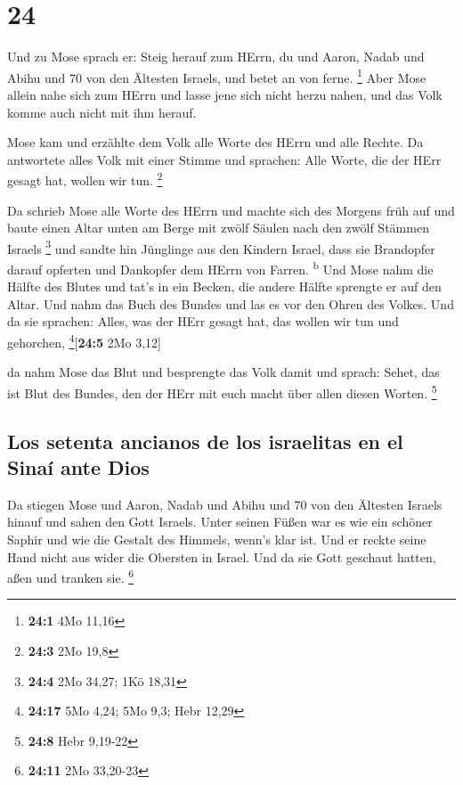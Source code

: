 \hypertarget{section-23}{%
\section{24}\label{section-23}}

 Und zu Mose sprach er: Steig herauf zum HErrn, du und
Aaron, Nadab und Abihu und 70 von den Ältesten Israels, und betet an von
ferne. \footnote{\textbf{24:1} 4Mo 11,16}  Aber Mose
allein nahe sich zum HErrn und lasse jene sich nicht herzu nahen, und
das Volk komme auch nicht mit ihm herauf.

 Mose kam und erzählte dem Volk alle Worte des HErrn und
alle Rechte. Da antwortete alles Volk mit einer Stimme und sprachen:
Alle Worte, die der HErr gesagt hat, wollen wir tun. \footnote{\textbf{24:3}
  2Mo 19,8}

 Da schrieb Mose alle Worte des HErrn und machte sich des
Morgens früh auf und baute einen Altar unten am Berge mit zwölf Säulen
nach den zwölf Stämmen Israels \footnote{\textbf{24:4} 2Mo 34,27; 1Kö
  18,31}  und sandte hin Jünglinge aus den Kindern Israel,
dass sie Brandopfer darauf opferten und Dankopfer dem HErrn von Farren.
\textsuperscript{b}  Und Mose nahm die Hälfte des Blutes
und tat's in ein Becken, die andere Hälfte sprengte er auf den Altar.
 Und nahm das Buch des Bundes und las es vor den Ohren des
Volkes. Und da sie sprachen: Alles, was der HErr gesagt hat, das wollen
wir tun und gehorchen, \footnote{\textbf{24:17} 5Mo 4,24; 5Mo 9,3; Hebr
  12,29}{[}\textbf{24:5} 2Mo 3,12{]}

 da nahm Mose das Blut und besprengte das Volk damit und
sprach: Sehet, das ist Blut des Bundes, den der HErr mit euch macht über
allen diesen Worten. \footnote{\textbf{24:8} Hebr 9,19-22}

\hypertarget{los-setenta-ancianos-de-los-israelitas-en-el-sinauxed-ante-dios}{%
\subsection{Los setenta ancianos de los israelitas en el Sinaí ante
Dios}\label{los-setenta-ancianos-de-los-israelitas-en-el-sinauxed-ante-dios}}

 Da stiegen Mose und Aaron, Nadab und Abihu und 70 von den
Ältesten Israels hinauf  und sahen den Gott Israels.
Unter seinen Füßen war es wie ein schöner Saphir und wie die Gestalt des
Himmels, wenn's klar ist.  Und er reckte seine Hand nicht
aus wider die Obersten in Israel. Und da sie Gott geschaut hatten, aßen
und tranken sie. \footnote{\textbf{24:11} 2Mo 33,20-23}

